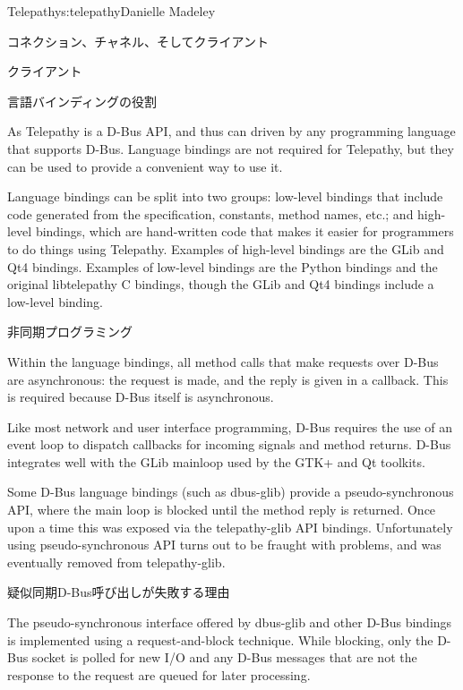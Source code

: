\begin{aosachapter}{Telepathy}{s:telepathy}{Danielle Madeley}
\begin{aosasect1}{コネクション、チャネル、そしてクライアント}
\begin{aosasect2}{クライアント}
\end{aosasect2}

\end{aosasect1}

\begin{aosasect1}{言語バインディングの役割}

As Telepathy is a D-Bus API, and thus can driven by any programming
language that supports D-Bus.  Language bindings are not required for
Telepathy, but they can be used to provide a convenient way to use it.

Language bindings can be split into two groups: low-level bindings
that include code generated from the specification, constants, method
names, etc.; and high-level bindings, which are hand-written code that
makes it easier for programmers to do things using Telepathy.
Examples of high-level bindings are the GLib and Qt4 bindings.
Examples of low-level bindings are the Python bindings and the
original libtelepathy C bindings, though the GLib and Qt4 bindings
include a low-level binding.

\begin{aosasect2}{非同期プログラミング}

Within the language bindings, all method calls that make requests over
D-Bus are asynchronous: the request is made, and the reply is given in
a callback. This is required because D-Bus itself is asynchronous.

Like most network and user interface programming, D-Bus requires the
use of an event loop to dispatch callbacks for incoming signals and
method returns. D-Bus integrates well with the GLib mainloop used by
the GTK+ and Qt toolkits.

Some D-Bus language bindings (such as dbus-glib) provide a
pseudo-synchronous API, where the main loop is blocked until the
method reply is returned.  Once upon a time this was exposed via the
telepathy-glib API bindings. Unfortunately using pseudo-synchronous
API turns out to be fraught with problems, and was eventually removed
from telepathy-glib.

\begin{aosabox}{疑似同期D-Bus呼び出しが失敗する理由}

The pseudo-synchronous interface offered by dbus-glib and other D-Bus
bindings is implemented using a request-and-block technique. While
blocking, only the D-Bus socket is polled for new I/O and any D-Bus
messages that are not the response to the request are queued for later
processing.


\end{aosabox}
\end{aosasect2}
\end{aosasect1}
\end{aosachapter}

